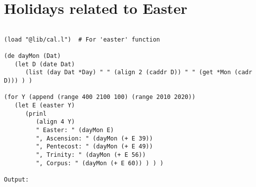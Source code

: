 \section*{Holidays related to Easter}

\begin{verbatim}

(load "@lib/cal.l")  # For 'easter' function

(de dayMon (Dat)
   (let D (date Dat)
      (list (day Dat *Day) " " (align 2 (caddr D)) " " (get *Mon (cadr D))) ) )

(for Y (append (range 400 2100 100) (range 2010 2020))
   (let E (easter Y)
      (prinl
         (align 4 Y)
         " Easter: " (dayMon E)
         ", Ascension: " (dayMon (+ E 39))
         ", Pentecost: " (dayMon (+ E 49))
         ", Trinity: " (dayMon (+ E 56))
         ", Corpus: " (dayMon (+ E 60)) ) ) )

Output:


\end{verbatim}
